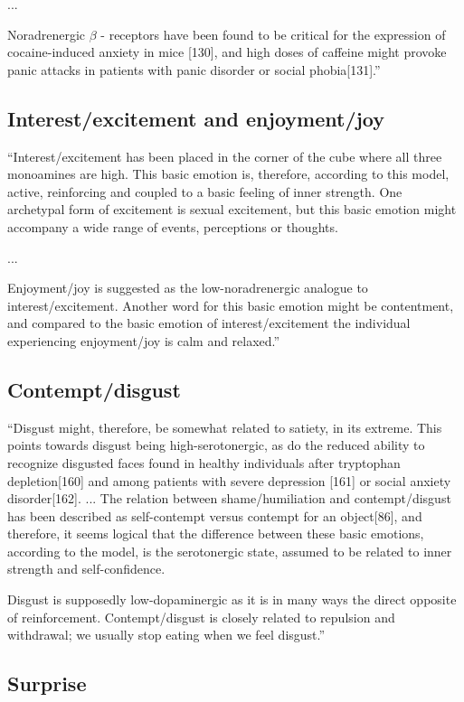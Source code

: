 ...

Noradrenergic $\beta$ - receptors have been found to be critical for the expression of cocaine-induced anxiety in mice [130], and high doses of caffeine might provoke panic attacks in patients with panic disorder or social phobia[131].''


\subsection{Interest/excitement and enjoyment/joy}

``Interest/excitement has been placed in the corner of the cube where all three monoamines are high. This basic emotion is, therefore, according to this model, active, reinforcing and coupled to a basic feeling of inner strength. One archetypal form of excitement is sexual excitement, but this basic emotion might accompany a wide range of events, perceptions or thoughts.

...

Enjoyment/joy is suggested as the low-noradrenergic analogue to interest/excitement. Another word for this basic emotion might
be contentment, and compared to the basic emotion of interest/excitement the individual experiencing enjoyment/joy is calm and relaxed.''

\subsection{Contempt/disgust}

``Disgust might, therefore, be somewhat related to satiety, in its extreme. This points towards disgust being high-serotonergic, as do the reduced ability to recognize disgusted faces found in healthy individuals after tryptophan depletion[160] and among patients with severe depression [161] or social anxiety disorder[162]. ... The relation between shame/humiliation and contempt/disgust has been described as self-contempt versus contempt for an object[86], and therefore, it seems logical that the difference between these basic emotions, according to the model, is the serotonergic state, assumed to be related to inner strength and self-confidence.

Disgust is supposedly low-dopaminergic as it is in many ways the direct opposite of reinforcement. Contempt/disgust is closely
related to repulsion and withdrawal; we usually stop eating when we feel disgust.''

\subsection{Surprise}


